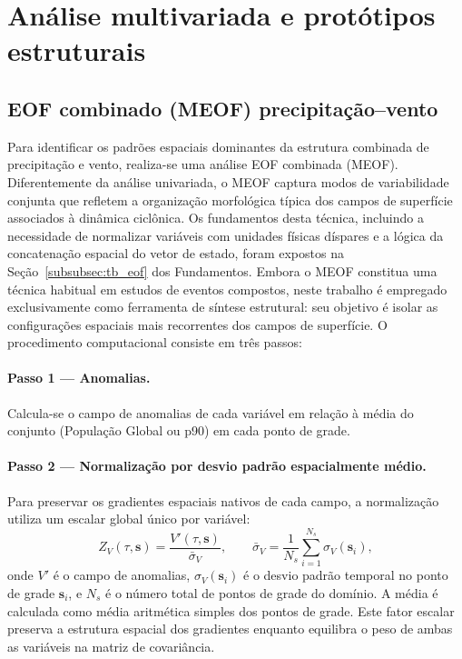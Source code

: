 
\section{Análise multivariada e protótipos estruturais}\label{sec:meof_prototipos}

\subsection{EOF combinado (MEOF) precipitação--vento}\label{subsec:eof_multivariado}

Para identificar os padrões espaciais dominantes da estrutura combinada de precipitação e vento, realiza-se uma análise EOF combinada (MEOF). Diferentemente da análise univariada, o MEOF captura modos de variabilidade conjunta que refletem a organização morfológica típica dos campos de superfície associados à dinâmica ciclônica. Os fundamentos desta técnica, incluindo a necessidade de normalizar variáveis com unidades físicas díspares e a lógica da concatenação espacial do vetor de estado, foram expostos na Seção~\ref{subsubsec:tb_eof} dos Fundamentos. Embora o MEOF constitua uma técnica habitual em estudos de eventos compostos, neste trabalho é empregado exclusivamente como ferramenta de síntese estrutural: seu objetivo é isolar as configurações espaciais mais recorrentes dos campos de superfície. O procedimento computacional consiste em três passos:

\paragraph{Passo 1 — Anomalias.} Calcula-se o campo de anomalias de cada variável em relação à média do conjunto (População Global ou p90) em cada ponto de grade.

\paragraph{Passo 2 — Normalização por desvio padrão espacialmente médio.} Para preservar os gradientes espaciais nativos de cada campo, a normalização utiliza um escalar global único por variável:
\begin{equation}
    Z_{V}(\tau, \mathbf{s}) =
        \frac{V'(\tau, \mathbf{s})}{\bar{\sigma}_{V}},
    \qquad
    \bar{\sigma}_{V} = \frac{1}{N_s} \sum_{i=1}^{N_s} \sigma_{V}(\mathbf{s}_i),
\end{equation}
onde $V'$ é o campo de anomalias, $\sigma_{V}(\mathbf{s}_i)$ é o desvio padrão temporal no ponto de grade $\mathbf{s}_i$, e $N_s$ é o número total de pontos de grade do domínio. A média é calculada como média aritmética simples dos pontos de grade.
Este fator escalar preserva a estrutura espacial dos gradientes enquanto
equilibra o peso de ambas as variáveis na matriz de covariância.

